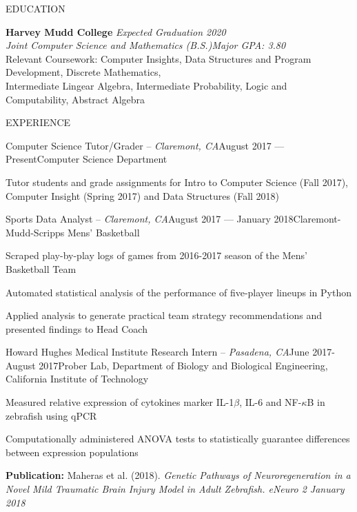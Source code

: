 \documentclass{resume} %
\begin{document}

\begin{rSection}{EDUCATION}

{\bf Harvey Mudd College} \hfill {\em Expected Graduation 2020} \\
{\em Joint Computer Science and Mathematics (B.S.)}\hfill {\em Major GPA: 3.80} \\
Relevant Coursework: Computer Insights, Data Structures and Program Development, Discrete Mathematics, \\Intermediate Lingear Algebra, Intermediate Probability, Logic and Computability, Abstract Algebra
\end{rSection}

\begin{rSection}{EXPERIENCE}
\begin{rSubsection}{Computer Science Tutor/Grader -- {\it Claremont, CA}}{August 2017 --- Present}{Computer Science Department}

\item Tutor students and grade assignments for Intro to Computer Science (Fall 2017), Computer Insight (Spring 2017) and Data Structures (Fall 2018)
\end{rSubsection}

\begin{rSubsection}{Sports Data Analyst -- {\it Claremont, CA}}{August 2017 --- January 2018}{Claremont-Mudd-Scripps Mens' Basketball}

\item Scraped play-by-play logs of games from 2016-2017 season of the Mens' Basketball Team
\item Automated statistical analysis of the performance of five-player lineups in Python
\item Applied analysis to generate practical team strategy recommendations and presented findings to Head Coach

\end{rSubsection}


\begin{rSubsection}{Howard Hughes Medical Institute Research Intern -- {\it Pasadena, CA}}{June 2017-August 2017}{Prober Lab, Department of Biology and Biological Engineering, California Institute of Technology}

\item Measured relative expression of cytokines marker IL-1$\beta$, IL-6 and NF-$\kappa$B in zebrafish using qPCR
\item Computationally administered ANOVA tests to statistically guarantee differences between expression populations
\item \textbf{Publication:} Maheras et al. (2018). \textit{Genetic Pathways of Neuroregeneration in a Novel Mild
Traumatic Brain Injury Model in Adult Zebrafish. eNeuro 2 January 2018}
\end{rSubsection}

\end{rSection}
\end{document}
